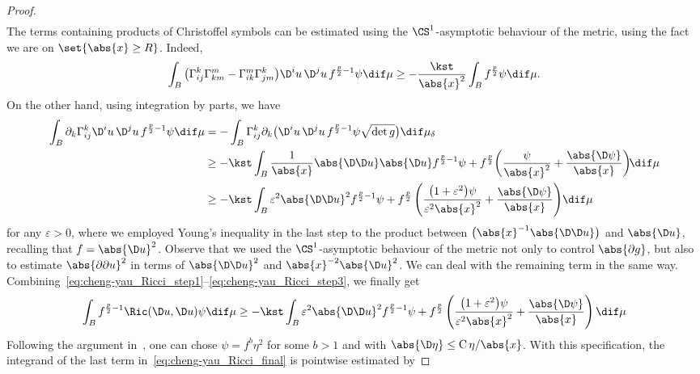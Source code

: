 \documentclass[10pt,a4paper]{amsart}
\numberwithin{equation}{section}
\begin{document}
\begin{proof}
\begin{align}
\end{align}
The terms containing products of Christoffel symbols can be estimated using the $\CS^1$-asymptotic behaviour of the metric, using the fact we are on $\set{\abs{x}\geq R}$. Indeed,
\begin{align}\label{eq:cheng-yau_Ricci_step2}
 \int_{B}\big(\Gamma^k_{ij}\Gamma^m_{km} - \Gamma^m_{ik} \Gamma^k_{jm}\big)\D^i u\,\D^ju\,f^{\frac{p}{2} - 1}\psi \dif\mu\geq - \frac{\kst}{\abs{x}^2} \int_B f^{\frac{p}{2}} \psi \dif \mu.
\end{align}
On the other hand, using integration by parts, we have
\begin{align}
 \int_{B}\partial_k \Gamma^k_{ij}\D^i u\,\D^ju\, f^{\frac{p}{2} - 1}\psi \dif\mu &{}=- \int_{B}\Gamma^k_{ij}\partial_k \big(\D^i u\,\D^ju\, f^{\frac{p}{2} - 1}\psi \sqrt{ \det g}\big)\dif\mu_\delta \nonumber\\
 &{}\geq - \kst \int_B \frac{1}{\abs{x}}\abs{\D\D u}\abs{\D u} f^{\frac{p}{2}-1} \psi + f^{\frac{p}{2}}\bigg( \frac{\psi}{\abs{x}^2} + \frac{\abs{\D \psi}}{\abs{x}}\bigg)\!\dif \mu \nonumber\\
 &{} \geq - \kst \int_B \varepsilon^2\abs{\D\D u}^2f^{\frac{p}{2}-1} \psi +f^{\frac{p}{2}}\left( \frac{\big(1+\varepsilon^2\big)\psi}{\varepsilon^2\abs{x}^2} + \frac{\abs{\D \psi}}{\abs{x}}\right) \!\dif \mu \label{eq:cheng-yau_Ricci_step3}
\end{align}
for any $\varepsilon>0$, where we employed Young's inequality in the last step to the product between $\big(\abs{x}^{-1}\abs{\D\D u}\big)$ and $\abs{\D u}$, recalling that $f = \abs{\D u}^2$. Observe that we used the $\CS^1$-asymptotic behaviour of the metric not only to control $\abs{\partial g}$, but also to estimate $\abs{\partial \partial u}^2$ in terms of $\abs{\D \D u}^2$ and $\abs{x}^{-2}\abs{\D u}^2$. We can deal with the remaining term in the same way. Combining~\eqref{eq:cheng-yau_Ricci_step1}--\eqref{eq:cheng-yau_Ricci_step3}, we finally get
\begin{equation}\label{eq:cheng-yau_Ricci_final}
 \int_{B}f^{\frac{p}{2} - 1} \Ric(\D u, \D u) \psi \dif\mu \geq - \kst \int_B \varepsilon^2\abs{\D\D u}^2f^{\frac{p}{2}-1} \psi +f^{\frac{p}{2}}\left( \frac{\big(1+\varepsilon^2\big)\psi}{\varepsilon^2\abs{x}^2} + \frac{\abs{\D \psi}}{\abs{x}}\right) \dif \mu
\end{equation}
Following the argument in~\cite[Theorem 1.1]{wang_localgradientestimateharmonic_2010}, one can chose $\psi = f^b \eta^2$ for some $b > 1$ and with $\abs{\D \eta} \leq \mathrm{C} \, \eta /\abs{x}$. With this specification, the integrand of the last term in~\eqref{eq:cheng-yau_Ricci_final} is pointwise estimated by

\end{proof}
\end{document}
